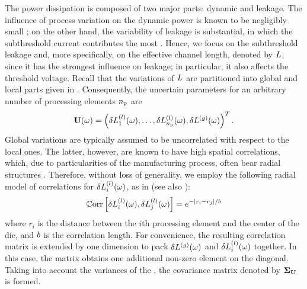 The power dissipation is composed of two major parts: dynamic and leakage.
The influence of process variation on the dynamic power is known to be negligibly small \cite{juan2011, juan2012, srivastava2010}; on the other hand, the variability of leakage is substantial, in which the subthreshold current contributes the most \cite{juan2011, juan2012}.
Hence, we focus on the subthreshold leakage and, more specifically, on the effective channel length, denoted by $L$, since it has the strongest influence on leakage; in particular, it also affects the threshold voltage.
Recall that the variations of $L$ are partitioned into global and local parts given in .
Consequently, the uncertain parameters for an arbitrary number of processing elements ${n_\text{p}}$ are
\[
  \mathbf{U}(\omega) = \left(\delta L^{(l)}_1(\omega), \dotsc, \delta L^{(l)}_{n_\text{p}}(\omega), {\delta L^{(g)}}(\omega) \right)^T.
\]
Global variations are typically assumed to be uncorrelated with respect to the local ones.
The latter, however, are known to have high spatial correlations, which, due to particularities of the manufacturing process, often bear radial structures \cite{friedberg2005, cheng2011}.
Therefore, without loss of generality, we employ the following radial model of correlations for $\delta L^{(l)}_i(\omega)$, as in \cite{ghanta2006} (see also \cite{ghanem1991}):
\begin{equation} \elabel{covariance-function}
  \oCorr{\lLeff_i(\o), \lLeff_j(\o)} = e^{-|r_i - r_j|/\corrLength}
\end{equation}
where $r_i$ is the distance between the $i$th processing element and the center of the die, and $b$ is the correlation length.
For convenience, the resulting correlation matrix is extended by one dimension to pack ${\delta L^{(g)}}(\omega)$ and $\delta L^{(l)}_i(\omega)$ together.
In this case, the matrix obtains one additional non-zero element on the diagonal. Taking into account the variances of the \rvs, the covariance matrix denoted by $\mCov_\vU$ is formed.
